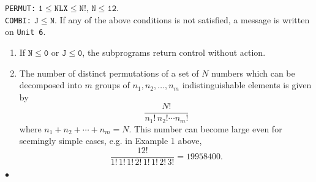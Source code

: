 \Restrict
{\tt PERMUT:} $\mathtt{1 \leq NLX \leq N!,\,N \leq 12}$. \\
{\tt COMBI:} $\mathtt{J \leq N}$.
\Errorh
If any of the above conditions is not satisfied, a message is written
on {\tt Unit 6}.
\Notes
\begin{enumerate}
\item If $\mathtt{N \leq 0}$ or $\mathtt{J \leq 0}$, the subprograms
return control without action.
\item The number of distinct permutations of a set of $N$ numbers
which can be decomposed into $m$ groups of $n_1,n_2,\ldots,n_m$
indistinguishable elements is given by
$$ \displaystyle \frac{N!}{n_1!\,n_2! \cdots n_m!} $$
where $n_1+n_2+\cdots+n_m = N$. This number can become large even
for seemingly simple cases, e.g. in Example 1 above,
$$ \displaystyle \frac{12!}{1!\,1!\,1!\,2!\,1!\,1!\,2!\,3!}
= 19958400. $$
\end{enumerate}
$\bullet$
